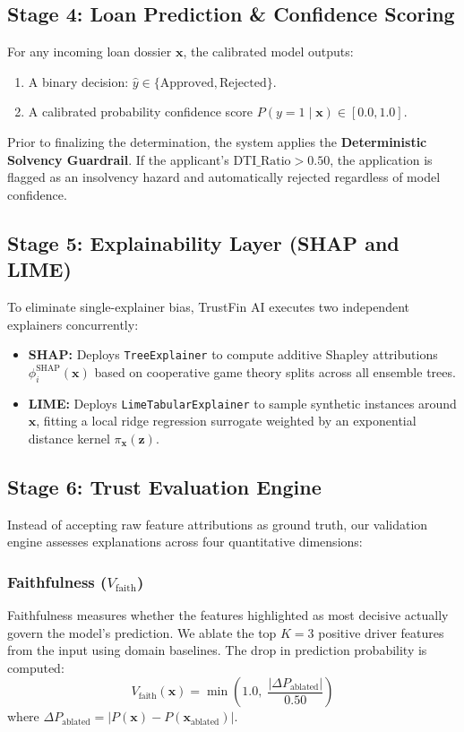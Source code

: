 \documentclass[conference]{IEEEtran}
\begin{document}
\subsection{Stage 4: Loan Prediction \& Confidence Scoring}
For any incoming loan dossier $\mathbf{x}$, the calibrated model outputs:
\begin{enumerate}
    \item A binary decision: $\hat{y} \in \{\text{Approved}, \text{Rejected}\}$.
    \item A calibrated probability confidence score $P(y=1 \mid \mathbf{x}) \in [0.0, 1.0]$.
\end{enumerate}
Prior to finalizing the determination, the system applies the \textbf{Deterministic Solvency Guardrail}. If the applicant's $\text{DTI\_Ratio} > 0.50$, the application is flagged as an insolvency hazard and automatically rejected regardless of model confidence.

\subsection{Stage 5: Explainability Layer (SHAP and LIME)}
To eliminate single-explainer bias, TrustFin AI executes two independent explainers concurrently:
\begin{itemize}
    \item \textbf{SHAP:} Deploys \texttt{TreeExplainer} to compute additive Shapley attributions $\phi_i^{\text{SHAP}}(\mathbf{x})$ based on cooperative game theory splits across all ensemble trees.
    \item \textbf{LIME:} Deploys \texttt{LimeTabularExplainer} to sample synthetic instances around $\mathbf{x}$, fitting a local ridge regression surrogate weighted by an exponential distance kernel $\pi_{\mathbf{x}}(\mathbf{z})$.
\end{itemize}

\subsection{Stage 6: Trust Evaluation Engine}
Instead of accepting raw feature attributions as ground truth, our validation engine assesses explanations across four quantitative dimensions:

\subsubsection{Faithfulness ($V_{\text{faith}}$)}
Faithfulness measures whether the features highlighted as most decisive actually govern the model's prediction. We ablate the top $K=3$ positive driver features from the input using domain baselines. The drop in prediction probability is computed:
\begin{equation}
    V_{\text{faith}}(\mathbf{x}) = \min\left(1.0, \; \frac{|\Delta P_{\text{ablated}}|}{0.50}\right)
\end{equation}
where $\Delta P_{\text{ablated}} = |P(\mathbf{x}) - P(\mathbf{x}_{\text{ablated}})|$.
\end{document}
